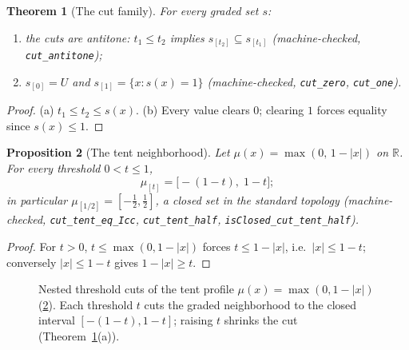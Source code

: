 \documentclass[11pt,a4paper]{article}
\newtheorem{theorem}{Theorem}[section]
\newtheorem{proposition}[theorem]{Proposition}
\newcommand{\Real}{\mathbb{R}}
\begin{document}
\begin{theorem}[The cut family]
\label{thm:cuts}
For every graded set $s$:
\begin{enumerate}[label=\textup{(\alph*)},nosep]
\item the cuts are antitone: $t_1 \le t_2$ implies
  $s_{[t_2]} \subseteq s_{[t_1]}$
  (machine-checked, \texttt{cut\_antitone});
\item $s_{[0]} = U$ and $s_{[1]} = \{x : s(x) = 1\}$
  (machine-checked, \texttt{cut\_zero}, \texttt{cut\_one}).
\end{enumerate}
\end{theorem}
\begin{proof}
(a) $t_1 \le t_2 \le s(x)$.
(b) Every value clears $0$; clearing $1$ forces equality since
$s(x) \le 1$.
\end{proof}

\begin{proposition}[The tent neighborhood]
\label{thm:tent}
Let $\mu(x) = \max(0,\, 1 - |x|)$ on $\Real$.
For every threshold $0 < t \le 1$,
\[
  \mu_{[t]} = \bigl[-(1 - t),\; 1 - t\bigr];
\]
in particular $\mu_{[1/2]} = [-\tfrac{1}{2}, \tfrac{1}{2}]$, a closed
set in the standard topology
(machine-checked, \texttt{cut\_tent\_eq\_Icc},
\texttt{cut\_tent\_half}, \texttt{isClosed\_cut\_tent\_half}).
\end{proposition}
\begin{proof}
For $t > 0$, $t \le \max(0, 1 - |x|)$ forces $t \le 1 - |x|$, i.e.\
$|x| \le 1 - t$; conversely $|x| \le 1 - t$ gives
$1 - |x| \ge t$.
\end{proof}

\begin{figure}[ht]
\centering
{}
\caption{Nested threshold cuts of the tent profile
$\mu(x) = \max(0, 1 - |x|)$ (\cref{thm:tent}).
Each threshold $t$ cuts the graded neighborhood to the closed interval
$[-(1-t), 1-t]$; raising $t$ shrinks the cut
(Theorem~\ref{thm:cuts}(a)).}
\label{fig:tent}
\end{figure}
\end{document}
